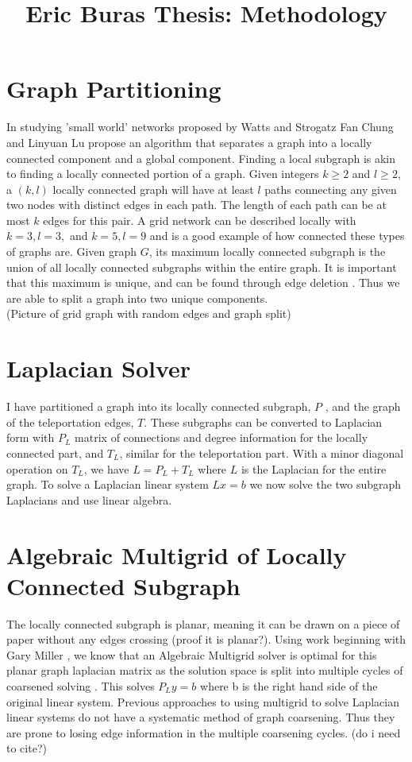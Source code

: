 \documentclass{article}
\begin{document}
\title{Eric Buras Thesis: Methodology}

\maketitle

\section{Graph Partitioning}
In studying 'small world' networks proposed by Watts and Strogatz \cite{Watts:1998} Fan Chung and Linyuan Lu propose an algorithm that separates a graph into a locally connected component and a global component. Finding a local subgraph is akin to finding a locally connected portion of a graph. Given integers $k \geq 2$ and $l \geq 2$, a $(k,l)$ locally connected graph will have at least $l$ paths connecting any given two nodes with distinct edges in each path. The length of each path can be at most $k$ edges for this pair. A grid network can be described locally with $k=3, l=3,$ and $k=5, l=9$ and is a good example of how connected these types of graphs are. Given graph $G$, its maximum locally connected subgraph is the union of all locally connected subgraphs within the entire graph. It is important that this maximum is unique, and can be found through edge deletion \cite{Chung:2004}. Thus we are able to split a graph into two unique components.\\

(Picture of grid graph with random edges and graph split)\\

\section{Laplacian Solver}
I have partitioned a graph into its locally connected subgraph, $P$ , and the graph of the teleportation edges, $T$. These subgraphs can be converted to Laplacian form with $P_L$ matrix of connections and degree information for the locally connected part, and $T_L$, similar for the teleportation part. With a minor diagonal operation on $T_L$, we have $L = P_L + T_L$ where $L$ is the Laplacian for the entire graph. To solve a Laplacian linear system $Lx=b$ we now solve the two subgraph Laplacians and use linear algebra.

\section{Algebraic Multigrid of Locally Connected Subgraph}
The locally connected subgraph is planar, meaning it can be drawn on a piece of paper without any edges crossing (proof it is planar?). Using work beginning with Gary Miller \cite{Miller:1995}, we know that an Algebraic Multigrid solver is optimal for this planar graph laplacian matrix as the solution space is split into multiple cycles of coarsened solving \cite{Brandt:1984}. This solves $P_L y=b$ where b is the right hand side of the original linear system. Previous approaches to using multigrid to solve Laplacian linear systems do not have a systematic method of graph coarsening. Thus they are prone to losing edge information in the multiple coarsening cycles. (do i need to cite?)
\end{document}
